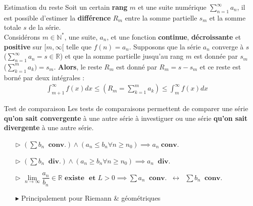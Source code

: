 \documentclass[16pt]{report}
\begin{document}
\begin{multicols*}{2}
    \begin{Theorem}{Estimation du reste}{}
        Soit un certain \textbf{rang} $m$ et une suite numérique 
        $\sum_{n=1}^{\infty}a_n$, il est possible d'estimer la 
        \textbf{différence} 
        $R_m$ entre la somme partielle $s_m$ et la somme totale 
        $s$ de la série. 
        \vspace{1em}\\ 
        Considérons $m \in \mathbb{N}^*$, 
        une suite, $a_n$, et une fonction 
        \textbf{continue}, \textbf{décroissante} 
        et \textbf{positive} sur $[m, \infty [$ 
        telle que $f(n) = a_n$. Supposons que la 
        série $a_n$ converge à $s$ 
        ($\sum_{n=1}^{\infty}a_n = s \in \mathbb{R}$) 
        et que la somme partielle jusqu'au rang $m$ est donnée  
        par $s_m$ ($\sum_{k=1}^{m} a_k) = s_m$. \textbf{Alors}, 
        le reste $R_m$ est donné par $R_m = s - s_m$ et 
        ce reste est borné par deux intégrales : 
        \begin{align*}
            \int_{m+1}^{\infty}f(x)dx \leq \left(R_m = \sum_{k=1}^{m} a_k\right) 
            \leq \int_{m}^{\infty}f(x)dx
        \end{align*}
    \end{Theorem}


    \begin{Theorem}{Test de comparaison}{}
        Les tests de comparaisons permettent de comparer une série 
        \textbf{qu'on sait convergente} à une autre série à investiguer 
        ou une série \textbf{qu'on sait divergente} à une autre série.   
        \vspace{1em}\\ 
     \begin{itemize}
         \item[$\rhd$ ] $\left(\sum   b_n  \;\; \textbf{conv.}\right) \land 
             (a_n \leq b_n \forall n \geq n_0) 
             \implies a_n \; \textbf{conv.}$ 
         \item[$\rhd$ ] $\left(\sum   b_n  \;\; \textbf{div.}\right) \land 
             (a_n \geq b_n \forall n \geq n_0) 
             \implies a_n \;\; \textbf{div.}$ 
         \item[$\rhd$ ] $\lim\limits_{n\to\infty}\dfrac{a_n}{b_n}
             \in \mathbb{R} \textbf{ existe } \textbf{ et } L > 0 
             \implies 
        \sum a_n \;\; \textbf{conv.} \;\; \leftrightarrow \;\; 
        \sum b_n \;\; \textbf{conv.}$ 
    \item[$\blacktriangleright$] Principalement pour Riemann \& géométriques
     \end{itemize}
    \end{Theorem}



\end{multicols*}
\end{document}
